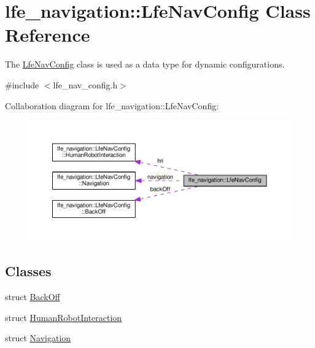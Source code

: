 \hypertarget{classlfe__navigation_1_1LfeNavConfig}{}\section{lfe\+\_\+navigation\+:\+:Lfe\+Nav\+Config Class Reference}
\label{classlfe__navigation_1_1LfeNavConfig}


The \hyperlink{classlfe__navigation_1_1LfeNavConfig}{Lfe\+Nav\+Config} class is used as a data type for dynamic configurations.  




{\ttfamily \#include $<$lfe\+\_\+nav\+\_\+config.\+h$>$}



Collaboration diagram for lfe\+\_\+navigation\+:\+:Lfe\+Nav\+Config\+:
\nopagebreak
\begin{figure}[H]
\begin{center}
\leavevmode
\includegraphics[width=350pt]{classlfe__navigation_1_1LfeNavConfig__coll__graph}
\end{center}
\end{figure}
\subsection*{Classes}
\begin{DoxyCompactItemize}
\item 
struct \hyperlink{structlfe__navigation_1_1LfeNavConfig_1_1BackOff}{Back\+Off}
\item 
struct \hyperlink{structlfe__navigation_1_1LfeNavConfig_1_1HumanRobotInteraction}{Human\+Robot\+Interaction}
\item 
struct \hyperlink{structlfe__navigation_1_1LfeNavConfig_1_1Navigation}{Navigation}
\end{DoxyCompactItemize}
